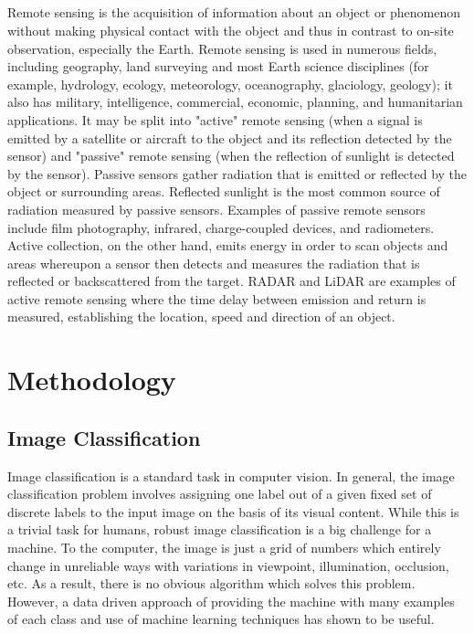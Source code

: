 \documentclass[12pt, a4paper]{report}
\begin{document}
\paragraph{}
Remote sensing is the acquisition of information about an object or phenomenon without making physical contact with the object and thus in contrast to on-site observation, especially the Earth. Remote sensing is used in numerous fields, including geography, land surveying and most Earth science disciplines (for example, hydrology, ecology, meteorology, oceanography, glaciology, geology); it also has military, intelligence, commercial, economic, planning, and humanitarian applications.  It may be split into "active" remote sensing (when a signal is emitted by a satellite or aircraft to the object and its reflection detected by the sensor) and "passive" remote sensing (when the reflection of sunlight is detected by the sensor). Passive sensors gather radiation that is emitted or reflected by the object or surrounding areas. Reflected sunlight is the most common source of radiation measured by passive sensors. Examples of passive remote sensors include film photography, infrared, charge-coupled devices, and radiometers. Active collection, on the other hand, emits energy in order to scan objects and areas whereupon a sensor then detects and measures the radiation that is reflected or backscattered from the target. RADAR and LiDAR are examples of active remote sensing where the time delay between emission and return is measured, establishing the location, speed and direction of an object. \cite{remotesensingwiki}
\newpage


\chapter{Methodology}
\section{Image Classification}

Image classification is a standard task in computer vision. In general, the image classification problem involves assigning one  label out of a given fixed set of discrete labels to the input image on the basis of its visual content. While this is a trivial task for humans, robust image classification is a big challenge for a machine. To the computer, the image is just a grid of numbers which entirely change in unreliable ways with variations in viewpoint, illumination, occlusion, etc. As a result, there is no obvious algorithm which solves this problem. However, a data driven approach of providing the machine with many examples of each class and use of machine learning techniques has shown to be useful.\cite{cs231n}
\end{document}

